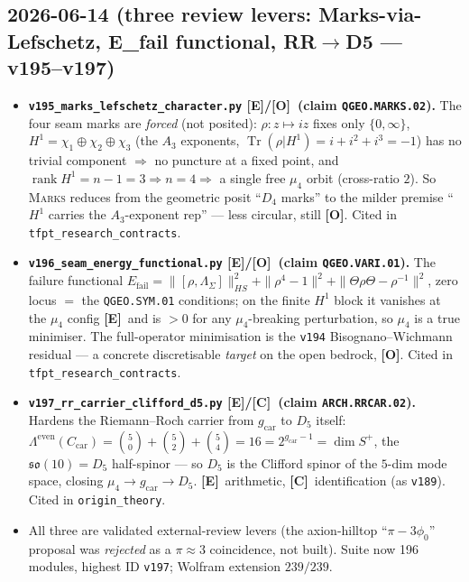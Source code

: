 \documentclass[11pt]{article}
\providecommand{\mE}{\textbf{[E]}}\providecommand{\mC}{\textbf{[C]}}
\providecommand{\mO}{\textbf{[O]}}\providecommand{\mX}{\textbf{[X]}}
\providecommand{\vref}[1]{\texttt{#1}}
\begin{document}
\subsection*{2026-06-14 (three review levers: Marks-via-Lefschetz, E\_fail functional, RR$\to$D5 --- v195--v197)}
\begin{itemize}
\item \textbf{\texttt{v195\_marks\_lefschetz\_character.py} \mE/\mO\ (claim \texttt{QGEO.MARKS.02}).} The four
  seam marks are \emph{forced} (not posited): $\rho{:}z\mapsto iz$ fixes only $\{0,\infty\}$, $H^1=
  \chi_1{\oplus}\chi_2{\oplus}\chi_3$ (the $A_3$ exponents, $\operatorname{Tr}(\rho|H^1)=i{+}i^2{+}i^3={-}1$)
  has no trivial component $\Rightarrow$ no puncture at a fixed point, and $\operatorname{rank}H^1=n{-}1=3
  \Rightarrow n=4 \Rightarrow$ a single free $\mu_4$ orbit (cross-ratio $2$). So \textsc{Marks} reduces from
  the geometric posit ``$D_4$ marks'' to the milder premise ``$H^1$ carries the $A_3$-exponent rep'' ---
  less circular, still \mO. Cited in \texttt{tfpt\_research\_contracts}.
\item \textbf{\texttt{v196\_seam\_energy\_functional.py} \mE/\mO\ (claim \texttt{QGEO.VARI.01}).} The
  failure functional $E_{\mathrm{fail}}=\|[\rho,\Lambda_\Sigma]\|^2_{HS}+\|\rho^4{-}1\|^2+\|\Theta\rho\Theta-\rho^{-1}\|^2$,
  zero locus $=$ the \texttt{QGEO.SYM.01} conditions; on the finite $H^1$ block it vanishes at the $\mu_4$
  config \mE\ and is $>0$ for any $\mu_4$-breaking perturbation, so $\mu_4$ is a true minimiser. The
  full-operator minimisation is the \vref{v194} Bisognano--Wichmann residual --- a concrete discretisable
  \emph{target} on the open bedrock, \mO. Cited in \texttt{tfpt\_research\_contracts}.
\item \textbf{\texttt{v197\_rr\_carrier\_clifford\_d5.py} \mE/\mC\ (claim \texttt{ARCH.RRCAR.02}).} Hardens
  the Riemann--Roch carrier from $g_{\mathrm{car}}$ to $D_5$ itself: $\Lambda^{\mathrm{even}}(C_{\mathrm{car}})
  =\binom50{+}\binom52{+}\binom54=16=2^{g_{\mathrm{car}}-1}=\dim S^+$, the $\mathfrak{so}(10)=D_5$
  half-spinor --- so $D_5$ is the Clifford spinor of the $5$-dim mode space, closing $\mu_4{\to}g_{\mathrm{car}}{\to}D_5$.
  \mE\ arithmetic, \mC\ identification (as \vref{v189}). Cited in \texttt{origin\_theory}.
\item All three are validated external-review levers (the axion-hilltop ``$\pi-3\phi_0$'' proposal was
  \emph{rejected} as a $\pi\approx3$ coincidence, not built). Suite now 196 modules, highest ID
  \texttt{v197}; Wolfram extension $239/239$.
\end{itemize}
\end{document}
